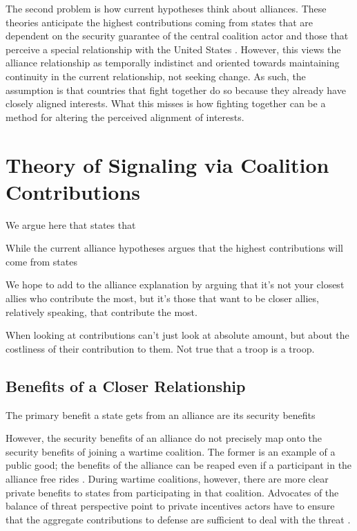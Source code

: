 \documentclass[12pt,letterpaper]{article}
\begin{document}
	The second problem is how current hypotheses think about alliances. These theories anticipate the highest contributions coming from states that are dependent on the security guarantee of the central coalition actor and those that perceive a special relationship with the United States \citep{haesebrouck_democraticparticipationair_2016, howorth_securitydefencepolicy_2014, graeger_revivalatlanticismnato_2009, biehl_strategiccultureseurope_2013}. However, this views the alliance relationship as temporally indistinct and oriented towards maintaining continuity in the current relationship, not seeking change. As such, the assumption is that countries that fight together do so because they already have closely aligned interests. What this misses is how fighting together can be a method for altering the perceived alignment of interests.
	
\section{Theory of Signaling via Coalition Contributions}
	We argue here that states that 
	
	While the current alliance hypotheses argues that the highest contributions will come from states 

	We hope to add to the alliance explanation by arguing that it's not your closest allies who contribute the most, but it's those that want to be closer allies, relatively speaking, that contribute the most.

	When looking at contributions can't just look at absolute amount, but about the costliness of their contribution to them. Not true that a troop is a troop.

	\subsection{Benefits of a Closer Relationship}
		The primary benefit a state gets from an alliance are its security benefits

		However, the security benefits of an alliance do not precisely map onto the security benefits of joining a wartime coalition. The former is an example of a public good; the benefits of the alliance can be reaped even if a participant in the alliance free rides \citep{olson_economictheoryalliances_1966}. During wartime coalitions, however, there are more clear private benefits to states from participating in that coalition. Advocates of the balance of threat perspective point to private incentives actors have to ensure that the aggregate contributions to defense are sufficient to deal with the threat \citep{bennett_friendsneedburden_1997, baltrusaitis_coalitionpoliticsiraq_2010, davidson_neoclassicalrealistexplanation_2011}.
\end{document}

